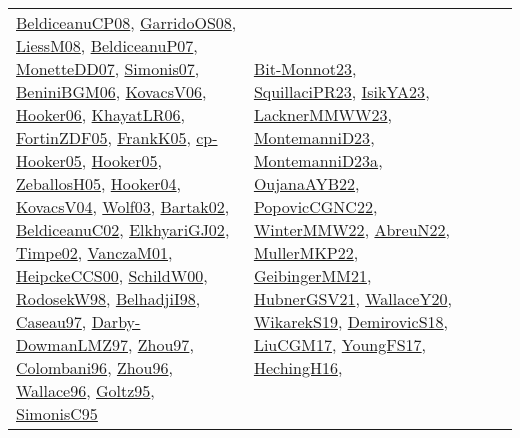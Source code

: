 {\begin{longtable}{llp{6cm}p{6cm}p{6cm}}
\href{papers/BeldiceanuCP08.pdf}{BeldiceanuCP08}\cite{BeldiceanuCP08}, \href{articles/GarridoOS08.pdf}{GarridoOS08}\cite{GarridoOS08}, \href{articles/LiessM08.pdf}{LiessM08}\cite{LiessM08}, \href{papers/BeldiceanuP07.pdf}{BeldiceanuP07}\cite{BeldiceanuP07}, \href{papers/MonetteDD07.pdf}{MonetteDD07}\cite{MonetteDD07}, \href{articles/Simonis07.pdf}{Simonis07}\cite{Simonis07}, \href{papers/BeniniBGM06.pdf}{BeniniBGM06}\cite{BeniniBGM06}, \href{papers/KovacsV06.pdf}{KovacsV06}\cite{KovacsV06}, \href{articles/Hooker06.pdf}{Hooker06}\cite{Hooker06}, \href{articles/KhayatLR06.pdf}{KhayatLR06}\cite{KhayatLR06}, \href{papers/FortinZDF05.pdf}{FortinZDF05}\cite{FortinZDF05}, \href{papers/FrankK05.pdf}{FrankK05}\cite{FrankK05}, \href{papers/cp-Hooker05.pdf}{cp-Hooker05}\cite{cp-Hooker05}, \href{articles/Hooker05.pdf}{Hooker05}\cite{Hooker05}, \href{articles/ZeballosH05.pdf}{ZeballosH05}\cite{ZeballosH05}, \href{papers/Hooker04.pdf}{Hooker04}\cite{Hooker04}, \href{papers/KovacsV04.pdf}{KovacsV04}\cite{KovacsV04}, \href{papers/Wolf03.pdf}{Wolf03}\cite{Wolf03}, \href{papers/Bartak02.pdf}{Bartak02}\cite{Bartak02}, \href{papers/BeldiceanuC02.pdf}{BeldiceanuC02}\cite{BeldiceanuC02}, \href{papers/ElkhyariGJ02.pdf}{ElkhyariGJ02}\cite{ElkhyariGJ02}, \href{articles/Timpe02.pdf}{Timpe02}\cite{Timpe02}, \href{papers/VanczaM01.pdf}{VanczaM01}\cite{VanczaM01}, \href{articles/HeipckeCCS00.pdf}{HeipckeCCS00}\cite{HeipckeCCS00}, \href{articles/SchildW00.pdf}{SchildW00}\cite{SchildW00}, \href{papers/RodosekW98.pdf}{RodosekW98}\cite{RodosekW98}, \href{articles/BelhadjiI98.pdf}{BelhadjiI98}\cite{BelhadjiI98}, \href{papers/Caseau97.pdf}{Caseau97}\cite{Caseau97}, \href{articles/Darby-DowmanLMZ97.pdf}{Darby-DowmanLMZ97}\cite{Darby-DowmanLMZ97}, \href{articles/Zhou97.pdf}{Zhou97}\cite{Zhou97}, \href{papers/Colombani96.pdf}{Colombani96}\cite{Colombani96}, \href{papers/Zhou96.pdf}{Zhou96}\cite{Zhou96}, \href{articles/Wallace96.pdf}{Wallace96}\cite{Wallace96}, \href{papers/Goltz95.pdf}{Goltz95}\cite{Goltz95}, \href{papers/SimonisC95.pdf}{SimonisC95}\cite{SimonisC95} & \href{papers/Bit-Monnot23.pdf}{Bit-Monnot23}\cite{Bit-Monnot23}, \href{papers/SquillaciPR23.pdf}{SquillaciPR23}\cite{SquillaciPR23}, \href{articles/IsikYA23.pdf}{IsikYA23}\cite{IsikYA23}, \href{articles/LacknerMMWW23.pdf}{LacknerMMWW23}\cite{LacknerMMWW23}, \href{articles/MontemanniD23.pdf}{MontemanniD23}\cite{MontemanniD23}, \href{articles/MontemanniD23a.pdf}{MontemanniD23a}\cite{MontemanniD23a}, \href{papers/OujanaAYB22.pdf}{OujanaAYB22}\cite{OujanaAYB22}, \href{papers/PopovicCGNC22.pdf}{PopovicCGNC22}\cite{PopovicCGNC22}, \href{papers/WinterMMW22.pdf}{WinterMMW22}\cite{WinterMMW22}, \href{articles/AbreuN22.pdf}{AbreuN22}\cite{AbreuN22}, \href{articles/MullerMKP22.pdf}{MullerMKP22}\cite{MullerMKP22}, \href{papers/GeibingerMM21.pdf}{GeibingerMM21}\cite{GeibingerMM21}, \href{articles/HubnerGSV21.pdf}{HubnerGSV21}\cite{HubnerGSV21}, \href{articles/WallaceY20.pdf}{WallaceY20}\cite{WallaceY20}, \href{articles/WikarekS19.pdf}{WikarekS19}\cite{WikarekS19}, \href{papers/DemirovicS18.pdf}{DemirovicS18}\cite{DemirovicS18}, \href{papers/LiuCGM17.pdf}{LiuCGM17}\cite{LiuCGM17}, \href{papers/YoungFS17.pdf}{YoungFS17}\cite{YoungFS17}, \href{papers/HechingH16.pdf}{HechingH16}\cite{HechingH16}, 
\end{longtable}}
